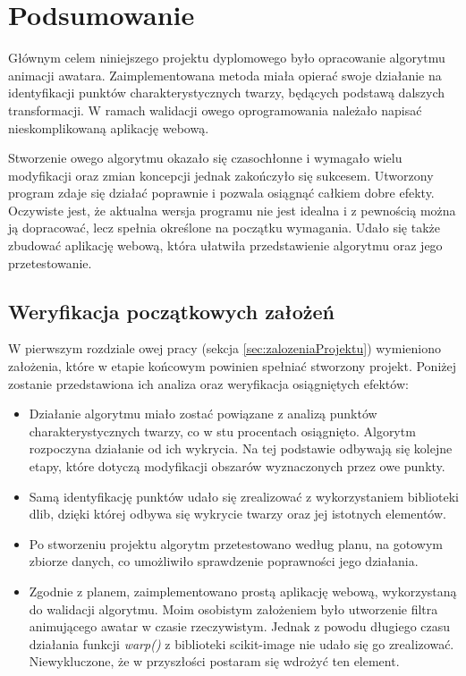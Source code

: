 \chapter{Podsumowanie}
\label{cha:podsumowanie}
Głównym celem niniejszego projektu dyplomowego było opracowanie algorytmu animacji awatara. Zaimplementowana metoda miała opierać swoje działanie na identyfikacji punktów charakterystycznych twarzy, będących podstawą dalszych transformacji. W ramach walidacji owego oprogramowania należało napisać nieskomplikowaną aplikację webową.

Stworzenie owego algorytmu okazało się czasochłonne i wymagało wielu modyfikacji oraz zmian koncepcji jednak zakończyło się sukcesem.  Utworzony program zdaje się działać poprawnie i pozwala osiągnąć całkiem dobre efekty. Oczywiste jest, że aktualna wersja programu nie jest idealna i z pewnością można ją dopracować, lecz spełnia określone na początku wymagania. Udało się także zbudować aplikację webową, która ułatwiła przedstawienie algorytmu oraz jego przetestowanie. %


\section{Weryfikacja początkowych założeń}
W pierwszym rozdziale owej pracy (sekcja \ref{sec:zalozeniaProjektu}) wymieniono założenia, które w etapie końcowym powinien spełniać stworzony projekt. Poniżej zostanie przedstawiona ich analiza oraz weryfikacja osiągniętych efektów:

\begin{itemize}
    \item Działanie algorytmu miało zostać powiązane z analizą punktów charakterystycznych twarzy, co w stu procentach osiągnięto. Algorytm rozpoczyna działanie od ich wykrycia. Na tej podstawie odbywają się kolejne etapy, które dotyczą modyfikacji obszarów wyznaczonych przez owe punkty.
    \item Samą identyfikację punktów udało się zrealizować z wykorzystaniem biblioteki dlib, dzięki której odbywa się wykrycie twarzy oraz jej istotnych elementów. 
    \item Po stworzeniu projektu algorytm przetestowano według planu, na gotowym zbiorze danych, co umożliwiło sprawdzenie poprawności jego działania.
    \item Zgodnie z planem, zaimplementowano prostą aplikację webową, wykorzystaną do walidacji algorytmu. Moim osobistym założeniem było utworzenie filtra animującego awatar w czasie rzeczywistym. Jednak z powodu długiego czasu działania funkcji \textit{warp()} z biblioteki scikit-image nie udało się go zrealizować. Niewykluczone, że w przyszłości postaram się wdrożyć ten element.
\end{itemize}

